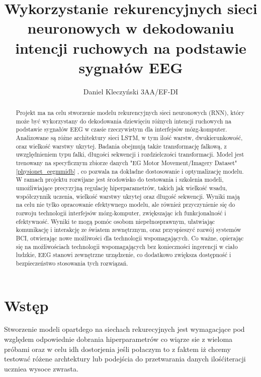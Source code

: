 \documentclass[12pt,twoside]{article}
\author{Daniel Kleczyński 3AA/EF-DI}
\title{Wykorzystanie rekurencyjnych sieci neuronowych w
dekodowaniu intencji ruchowych na podstawie sygnałów EEG}
\begin{document}
    \maketitle

    \blankpage

    \tableofcontents

    \clearpage
    \blankpage


    \begin{abstract}

        Projekt ma na celu stworzenie modelu rekurencyjnych sieci neuronowych (RNN), który może być wykorzystany do
        dekodowania dziewięciu różnych intencji ruchowych na podstawie sygnałów EEG w czasie rzeczywistym dla
        interfejsów mózg-komputer. Analizowane są różne architektury sieci LSTM, w tym ilość warstw, dwukierunkowość,
        oraz wielkość warstwy ukrytej. Badania obejmują także transformację falkową, z uwzględnieniem typu falki,
        długości sekwencji i rozdzielczości transformacji. Model jest trenowany na specyficznym zbiorze danych "EG Motor
        Movement/Imagery Dataset" \ref{physionet_eegmmidb}
        , co pozwala na dokładne dostosowanie i optymalizację modelu. W ramach projektu rozwijane jest środowisko do
        testowania i szkolenia modeli, umożliwiające precyzyjną regulację hiperparametrów, takich jak wielkość wsadu,
        współczynnik uczenia, wielkość warstwy ukrytej oraz długość sekwencji. Wyniki mają na celu nie tylko opracowanie
        efektywnego modelu,  ale również przyczynienie się do rozwoju technologii interfejsów mózg-komputer, zwiększając
        ich funkcjonalność i efektywność. Wyniki te mogą pomóc osobom niepełnosprawnym, ułatwiając komunikację i
        interakcję ze światem zewnętrznym, oraz przyspieszyć rozwój systemów BCI, otwierając nowe możliwości dla
        technologii wspomagających. Co ważne, opierając się na możliwościach technologii wspomagających bez konieczności
        ingerencji w ciało ludzkie, EEG stanowi zewnętrzne urządzenie, co dodatkowo zwiększa dostępność i bezpieczeństwo
        stosowania tych rozwiązań.
    \end{abstract}

    \clearpage


    \section{Wstęp}
    Stworzenie modeli opartdego na siechach rekurecyjnych jest wymagacjące pod względem odpowiednie dobrania
    hiperparametrów co wiąrze sie z wieloma próbami oraz w celu idh dostorjenia jeśli połaczym to z faktem iż chcemy
    testować różene archtektury lub podejścia do przetwarania danych ilośćiteracji uczniea wysoce zwrasta.
\end{document}
